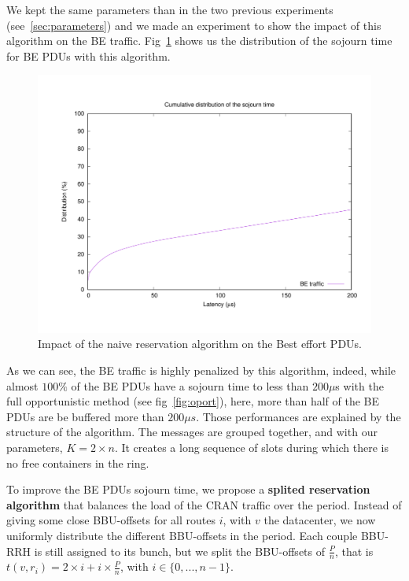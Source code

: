 \documentclass[a4paper,10pt,english]{article}
\begin{document}
We kept the same parameters than in the two previous experiments (see~\ref{sec:parameters}) and we made an experiment to show the impact of this algorithm on the BE traffic. Fig~\ref{fig:res1} shows us the distribution of the sojourn time for BE PDUs with this algorithm.

      \begin{figure}[h]
\centering
      \includegraphics[scale=0.4]{res1.pdf}
     \caption{Impact of the naive reservation algorithm on the Best effort PDUs.}   \label{fig:res1}
  \end{figure}

As we can see, the BE traffic is highly penalized by this algorithm, indeed, while almost $100\%$ of the BE PDUs have a sojourn time to less than $200 \mu$s with the full opportunistic method (see fig~\ref{fig:oport}), here, more than half of the BE PDUs are be buffered more than $200\mu s$. Those performances are explained by the structure of the algorithm. The messages are grouped together, and with our parameters, $K = 2\times n$. It creates a long sequence of slots during which there is no free containers in the ring. 

To improve the BE PDUs sojourn time, we propose a {\bf splited reservation algorithm} that balances the load of the CRAN traffic over the period. Instead of giving some close BBU-offsets for all routes $i$, with $v$ the datacenter, we now uniformly distribute the different BBU-offsets in the period. Each couple BBU-RRH is still assigned to its bunch, but we split the BBU-offsets of $\frac{P}{n}$, that is $t(v,r_i)= 2\times i+ i\times \frac{P}{n}$, with $i \in \{0,...,n-1\}$.
\end{document}
